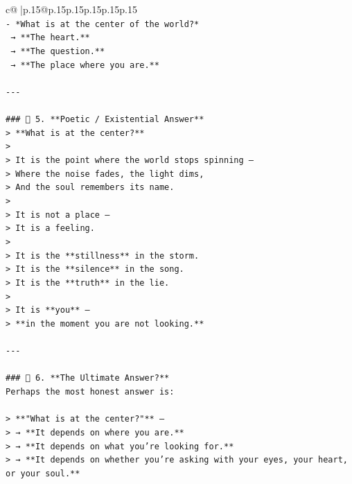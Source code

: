 \documentclass{article}
\begin{document}
{\begin{supertabular}{c@{$\;$}|p{.15\linewidth}@{}p{.15\linewidth}p{.15\linewidth}p{.15\linewidth}p{.15\linewidth}p{.15\linewidth}}
{{{\\ 
\texttt{{-} *What is at the center of the world?*  } \\
\texttt{  → **The heart.**  } \\
\texttt{  → **The question.**  } \\
\texttt{  → **The place where you are.**} \\
\\ 
\texttt{{-}{-}{-}} \\
\\ 
\texttt{\#\#\# 🔹 5. **Poetic / Existential Answer**  } \\
\texttt{> **What is at the center?**  } \\
\texttt{>  } \\
\texttt{> It is the point where the world stops spinning —  } \\
\texttt{> Where the noise fades, the light dims,  } \\
\texttt{> And the soul remembers its name.  } \\
\texttt{>  } \\
\texttt{> It is not a place —  } \\
\texttt{> It is a feeling.  } \\
\texttt{>  } \\
\texttt{> It is the **stillness** in the storm.  } \\
\texttt{> It is the **silence** in the song.  } \\
\texttt{> It is the **truth** in the lie.  } \\
\texttt{>  } \\
\texttt{> It is **you** —  } \\
\texttt{> **in the moment you are not looking.**} \\
\\ 
\texttt{{-}{-}{-}} \\
\\ 
\texttt{\#\#\# 🔹 6. **The Ultimate Answer?**  } \\
\texttt{Perhaps the most honest answer is:} \\
\\ 
\texttt{> **"What is at the center?"** —  } \\
\texttt{> → **It depends on where you are.**  } \\
\texttt{> → **It depends on what you’re looking for.**  } \\
\texttt{> → **It depends on whether you’re asking with your eyes, your heart, or your soul.**} \\
\\ 
}}}
\end{supertabular}}
\end{document}
